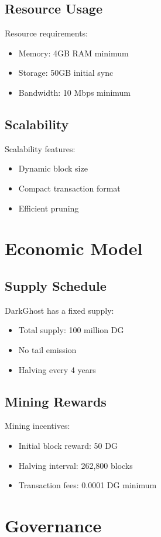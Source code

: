 \documentclass[11pt]{article}
\begin{document}
\subsection{Resource Usage}
Resource requirements:
\begin{itemize}
    \item Memory: 4GB RAM minimum
    \item Storage: 50GB initial sync
    \item Bandwidth: 10 Mbps minimum
\end{itemize}

\subsection{Scalability}
Scalability features:
\begin{itemize}
    \item Dynamic block size
    \item Compact transaction format
    \item Efficient pruning
\end{itemize}

\section{Economic Model}
\subsection{Supply Schedule}
DarkGhost has a fixed supply:
\begin{itemize}
    \item Total supply: 100 million DG
    \item No tail emission
    \item Halving every 4 years
\end{itemize}

\subsection{Mining Rewards}
Mining incentives:
\begin{itemize}
    \item Initial block reward: 50 DG
    \item Halving interval: 262,800 blocks
    \item Transaction fees: 0.0001 DG minimum
\end{itemize}

\section{Governance}
\end{document}
